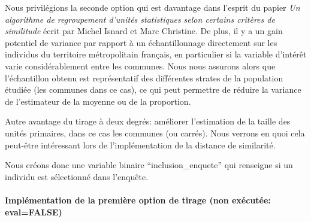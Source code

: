 \documentclass[
]{article}
\newenvironment{Shaded}{\begin{snugshade}}{\end{snugshade}}
\newcommand{\AttributeTok}[1]{\textcolor[rgb]{0.77,0.63,0.00}{#1}}
\newcommand{\CommentTok}[1]{\textcolor[rgb]{0.56,0.35,0.01}{\textit{#1}}}
\newcommand{\ControlFlowTok}[1]{\textcolor[rgb]{0.13,0.29,0.53}{\textbf{#1}}}
\newcommand{\DecValTok}[1]{\textcolor[rgb]{0.00,0.00,0.81}{#1}}
\newcommand{\FunctionTok}[1]{\textcolor[rgb]{0.00,0.00,0.00}{#1}}
\newcommand{\NormalTok}[1]{#1}
\newcommand{\OtherTok}[1]{\textcolor[rgb]{0.56,0.35,0.01}{#1}}
\newcommand{\SpecialCharTok}[1]{\textcolor[rgb]{0.00,0.00,0.00}{#1}}
\newcommand{\StringTok}[1]{\textcolor[rgb]{0.31,0.60,0.02}{#1}}
\begin{document}
Nous privilégions la seconde option qui est davantage dans l'esprit du
papier \emph{Un algorithme de regroupement d'unités statistiques selon
certains critères de similitude} écrit par Michel Isnard et Marc
Christine. De plus, il y a un gain potentiel de variance par rapport à
un échantillonnage directement sur les individus du territoire
métropolitain français, en particulier si la variable d'intérêt varie
considérablement entre les communes. Nous nous assurons alors que
l'échantillon obtenu est représentatif des différentes strates de la
population étudiée (les communes dans ce cas), ce qui peut permettre de
réduire la variance de l'estimateur de la moyenne ou de la proportion.

Autre avantage du tirage à deux degrés: améliorer l'estimation de la
taille des unités primaires, dans ce cas les communes (ou carrés). Nous
verrons en quoi cela peut-être intéressant lors de l'implémentation de
la distance de similarité.

Nous créons donc une variable binaire ``inclusion\_enquete'' qui
renseigne si un individu est sélectionné dans l'enquête.

\hypertarget{impluxe9mentation-de-la-premiuxe8re-option-de-tirage-non-exuxe9cutuxe9e-evalfalse}{%
\paragraph{Implémentation de la première option de tirage (non exécutée:
eval=FALSE)}\label{impluxe9mentation-de-la-premiuxe8re-option-de-tirage-non-exuxe9cutuxe9e-evalfalse}}

\begin{Shaded}
\end{Shaded}
\end{document}

